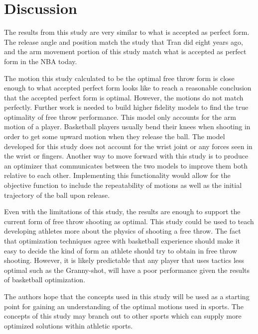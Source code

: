 
\section*{Discussion}
\begin{multicols}{2}
The results from this study are very similar to what is accepted as perfect form. The release angle and position match the study that Tran did eight years ago, and the arm movement portion of this study match what is accepted as perfect form in the NBA today.

The motion this study calculated to be the optimal free throw form is close enough to what accepted perfect form looks like to reach a reasonable conclusion that the accepted perfect form is optimal. However, the motions do not match perfectly. Further work is needed to build higher fidelity models to find the true optimality of free throw performance. This model only accounts for the arm motion of a player. Basketball players usually bend their knees when shooting in order to get some upward motion when they release the ball. The model developed for this study does not account for the wrist joint or any forces seen in the wrist or fingers. Another way to move forward with this study is to produce an optimizer that communicates between the two models to improve them both relative to each other.  Implementing this functionality would allow for the objective function to include the repeatability of motions as well as the initial trajectory of the ball upon release.

Even with the limitations of this study, the results are enough to support the current form of free throw shooting as optimal. This study could be used to teach developing athletes more about the physics of shooting a free throw. The fact that optimization techniques agree with basketball experience should make it easy to decide the kind of form an athlete should try to obtain in free throw shooting. However, it is likely predictable that any player that uses tactics less optimal such as the Granny-shot, will have a poor performance given the results of basketball optimization.

The authors hope that the concepts used in this study will be used as a starting point for gaining an understanding of the optimal motions used in sports. The concepts of this study may branch out to other sports which can supply more optimized solutions within athletic sports.

\end{multicols}